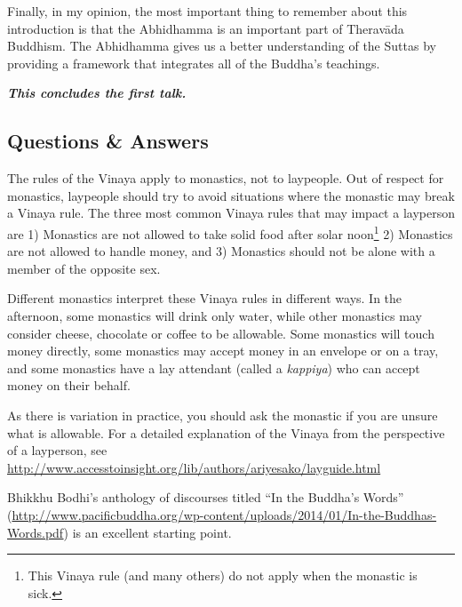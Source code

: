 Finally, in my opinion, the most important thing to remember about this introduction is that the Abhidhamma is an important part of Theravāda Buddhism. The Abhidhamma gives us a better understanding of the Suttas by providing a framework that integrates all of the Buddha’s teachings.

\begin{center}
\textbf{\textit{This concludes the first talk.}} \\
\end{center}

\newpage

\subsection*{Questions \& Answers}


The rules of the Vinaya apply to monastics, not to laypeople. Out of respect for monastics, laypeople should try to avoid situations where the monastic may break a Vinaya rule. The three most common Vinaya rules that may impact a layperson are 1) Monastics are not allowed to take solid food after solar noon\footnote{This Vinaya rule (and many others) do not apply when the monastic is sick.} 2) Monastics are not allowed to handle money, and 3) Monastics should not be alone with a member of the opposite sex.

Different monastics interpret these Vinaya rules in different ways. In the afternoon, some monastics will drink only water, while other monastics may consider cheese, chocolate or coffee to be allowable. Some monastics will touch money directly, some monastics may accept money in an envelope or on a tray, and some monastics have a lay attendant (called a \textit{kappiya}) who can accept money on their behalf.

As there is variation in practice, you should ask the monastic if you are unsure what is allowable. For a detailed explanation of the Vinaya from the perspective of a layperson, see \url{http://www.accesstoinsight.org/lib/authors/ariyesako/layguide.html}


Bhikkhu Bodhi’s anthology of discourses titled “In the Buddha’s Words” (\url{http://www.pacificbuddha.org/wp-content/uploads/2014/01/In-the-Buddhas-Words.pdf}) is an excellent starting point. 

